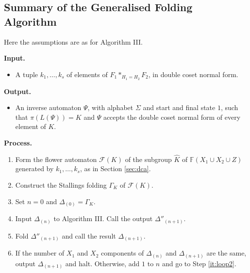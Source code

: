 \documentclass[a4paper,12pt]{article}
\newcommand{\G}{\Gamma }
\newcommand{\D}{\Delta }
\newcommand{\cF}{{\cal{F}}}
\numberwithin{equation}{section}
\numberwithin{figure}{section}
\newcommand{\FF}{\ensuremath{\mathbb{F}}}
\renewcommand{\cF}{\mathcal{F}}
\newcommand{\be}{\begin{enumerate}}
\newcommand{\ee}{\end{enumerate}}
\newcommand{\biz}{\begin{itemize}}
\newcommand{\eiz}{\end{itemize}}
\begin{document}
\subsection{Summary of the Generalised Folding Algorithm}\label{sec:GFA}
Here the assumptions are as for Algorithm III.

\noindent\textbf{Input.}
\biz
\item A tuple $k_1, \ldots ,k_s$ of elements of $F_1*_{H_1=H_2}F_2$,
in double coset normal form.
\eiz
\noindent\textbf{Output.}
\biz
\item An inverse automaton $\Psi$, with alphabet $\Sigma$ and start
and final state $1$, such that $\pi(L(\Psi))=K$ and $\Psi$ accepts the
double coset normal form of every element of $K$.
\eiz
\noindent\textbf{Process.}\\
\be[{E}1]
\item Form the flower automaton $\cF(K)$ of the subgroup $\hat K$ of 
$\FF(X_1\cup X_2\cup Z)$ generated by $k_1,\ldots, k_s$, as in Section 
\ref{sec:dca}. 
\item Construct the Stallings folding $\G_K$ of $\cF(K)$. 
\item Set $n=0$ and $\D_{(0)}=\G_K$.
\item\label{it:loop2} Input $\D_{(n)}$ to Algorithm III.
Call the output $\D''_{(n+1)}$.
\item\label{it:loop3} Fold  $\D''_{(n+1)}$ and call the result   $\D_{(n+1)}$.
\item\label{it:loop4} If the number of $X_1$ and $X_2$ components of $\D_{(n)}$ and
$\D_{(n+1)}$ are the same, output $\D_{(n+1)}$ and halt. Otherwise,
 add $1$ to $n$ and go to Step \ref{it:loop2}.
\ee
\end{document}

